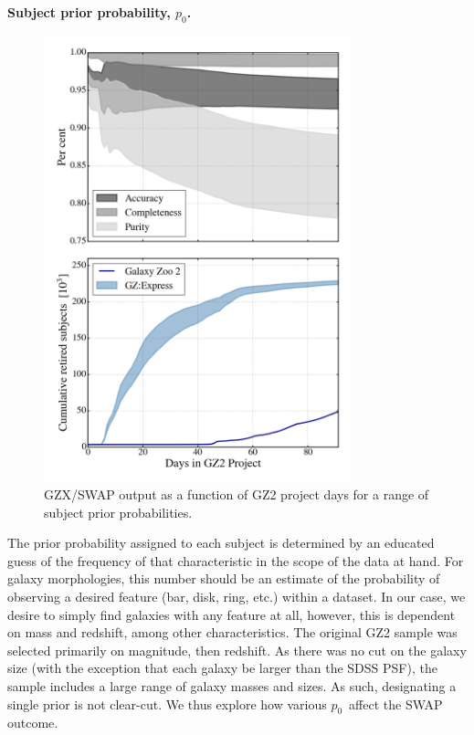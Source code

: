\documentclass[twocolumn]{aastex6}
\newcommand{\p}{$p_0$}
\begin{document}
\textbf{Subject prior probability, \p.}
\begin{figure}[t!]
\includegraphics[width=3.5in]{GZX_eval_and_retirement_prior_spread_4paper.png}
\caption{GZX/SWAP output as a function of GZ2 project days for a range of subject prior probabilities.  \label{fig: priorAnalysis}}
\end{figure}
The prior probability assigned to each subject is determined by an educated guess of 
the frequency of that characteristic in the scope of the data at hand. 
For galaxy morphologies, this number should be an estimate of the probability
of observing a desired feature (bar, disk, ring, etc.) within a dataset. In our case, 
we desire to simply find galaxies with any feature at all, however, this is dependent 
on mass and redshift, among other characteristics. The original GZ2 sample was selected
primarily on magnitude, then redshift.  As there was no cut on the galaxy size
(with the exception that each galaxy be larger than the SDSS PSF), the sample
includes a large range of galaxy masses and sizes. As such, designating a single 
prior is not clear-cut. We thus explore how various \p~affect the SWAP outcome.
\end{document}
